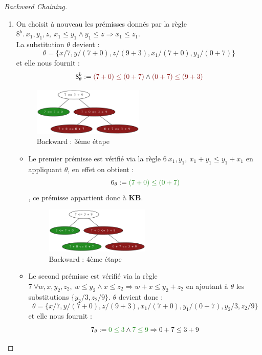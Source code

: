 \documentclass{article}
\newcommand{\forest}[1]{\textcolor{forestgreen}{#1}}
\newcommand{\firebrick}[1]{\textcolor{firebrick4}{#1}}
\newtheorem{proof}{Preuve}
\begin{document}
\begin{sffamily}
\begin{enumerate}
\begin{proof}[Backward Chaining]
\begin{enumerate}[1.]
\item On choisit à nouveau les prémisses donnés par la règle $8^b.\ x_1, y_1, z,\ x_1 \leq y_1 \wedge y_1 \leq z 
\Rightarrow x_1 \leq z_1$.\\ La substitution $\theta$ devient : $$\theta = \{x/7, y/(7+0), z/(9+3), x_1/(7+0), y_1/(0+7)\}$$
et elle nous fournit :
$$8^b_\theta := \firebrick{(7+0)\leq (0+7)} \wedge \firebrick{(0+7)\leq (9+3)}$$
\newpage
\begin{figure}[h!]
    \begin{center}
    \includegraphics[width=0.5\textwidth]{backward3.pdf}
    \caption{Backward : 3ème étape}
    \end{center}	
\end{figure}
\begin{itemize}
\item Le premier prémisse est vérifié via la règle $6\ x_1, y_1,\ x_1 + y_1 \leq y_1 + x_1$ en appliquant $\theta$, en 
effet on obtient : $$6_\theta := \forest{(7+0)\leq (0+7)}$$, ce prémisse appartient donc à \textbf{KB}.
\begin{figure}[h!]
    \begin{center}
    \includegraphics[width=0.5\textwidth]{backward4.pdf}
    \caption{Backward : 4ème étape}
    \end{center}	
\end{figure}
\item Le second prémisse est vérifié via la règle $7\ \forall w, x, y_2, z_2,\ w \leq y_2 \wedge x \leq z_2 \Rightarrow w + x 
\leq y_2 + z_2$ en ajoutant à $\theta$ les substitutions $\{y_2/3,z_2/9\}$. $\theta$ devient donc : 
$$ \theta = \{x/7, y/(7+0), z/(9+3), x_1/(7+0), y_1/(0+7), y_2/3, z_2/9\} $$ et elle nous fournit :
$$7_\theta := \forest{0\leq 3} \wedge \forest{7\leq 9} \Rightarrow 0+7\leq3+9$$
\begin{figure}[h!]
    \begin{center}

\end{center}
\end{figure}
\end{itemize}
\end{enumerate}
\end{proof}
\end{enumerate}
\end{sffamily}
\end{document}

